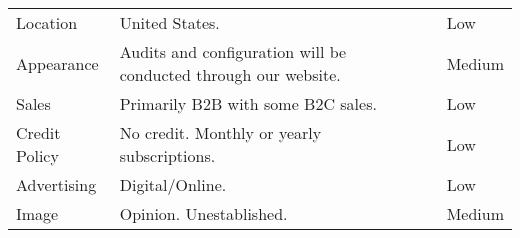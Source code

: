 \begin{table}[H]
\begin{tabularx}{\textwidth}{p{2cm}|p{6.2cm} p{1.5cm} p{1.75cm} p{1.85cm} }
    Location & United States. & & & Low \\

    Appearance & Audits and configuration will be conducted through our website. & & & Medium \\

    Sales & Primarily B2B with some B2C sales. & & & Low \\

    Credit Policy & No credit. Monthly or yearly subscriptions. & & & Low \\

    Advertising & Digital/Online. & & & Low \\

    Image & Opinion. Unestablished. & & \centering{x} & Medium \\

    \hline

  \end{tabularx}
  \label{table.cereus.overview}
\end{table}


